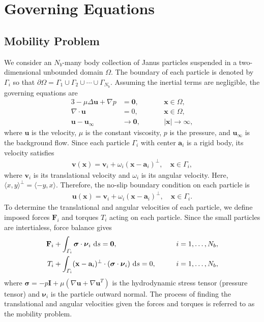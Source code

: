 \documentclass[lineno]{jfm}
\renewcommand{\aa}{\mathbf{a}}
\newcommand{\bd}{\partial}
\newcommand{\FF}{\mathbf{F}}
\newcommand{\nnu}{\boldsymbol{\nu}}
\newcommand{\ssigma}{\boldsymbol{\sigma}}
\newcommand{\xx}{\mathbf{x}}
\newcommand{\uu}{\mathbf{u}}
\renewcommand{\vv}{\mathbf{v}}
\begin{document}
\section{Governing Equations\label{sec:governing_eqs}}
\subsection{\label{mobility}Mobility Problem}
We consider an $N_b$-many body collection of Janus particles suspended
in a two-dimensional unbounded domain $\Omega$. The boundary of each
particle is denoted by $\Gamma_i$ so that $\bd \Omega = \Gamma_1 \cup
\Gamma_2 \cup \cdots \cup \Gamma_{N_b}$. Assuming the inertial terms are negligible, the
governing equations are
\begin{alignat}{3}
  -\mu \Delta \uu + \nabla p &= \mathbf{0}, 
    && \xx \in \Omega, \\
  \nabla\cdot \uu &= 0, \qquad && \xx \in \Omega, \\
  \uu - \uu_\infty &\to \mathbf{0}, && |\xx| \to \infty,
\end{alignat}
%
where $\uu$ is the velocity, $\mu$ is the constant viscosity, $p$ is the
pressure, and $\uu_\infty$ is the background flow. Since each particle
$\Gamma_i$ with center $\aa_i$ is a rigid body, its velocity satisfies 
\begin{align}
  \vv(\xx) = \vv_i + \omega_i (\xx - \aa_i)^\perp, \quad 
    \xx \in \Gamma_i,
\end{align}
where $\vv_i$ is its translational velocity and $\omega_i$ is its
angular velocity. Here, $\langle x, y \rangle^{\perp} = \langle -y, x
\rangle$. Therefore, the no-slip boundary condition on each particle is
\begin{align}
  \uu(\xx) = \vv_i + \omega_i (\xx - \aa_i)^\perp, \quad
    \xx \in \Gamma_i.
\end{align}
To determine the translational and angular velocities of each particle,
we define imposed forces $\FF_i$ and torques $T_i$ acting on each
particle. Since the small particles are intertialess, force balance
gives 
\begin{alignat}{2}
  \label{eq:force}
  \FF_i &+ \int_{\Gamma_i} \ssigma \cdot \nnu_i \, \dif s = \mathbf{0},
  && i=1,\ldots,N_b,\\
  \label{eq:torque}
  T_i &+ \int_{\Gamma_i} (\xx - \aa_i)^\perp \cdot 
    (\ssigma \cdot \nnu_i) \, \dif s = 0, \qquad && i=1,\ldots,N_b,
\end{alignat}
where $\ssigma = -p \mathbf{I} + \mu \left(\nabla \uu + \nabla \uu^T
\right)$ is the hydrodynamic stress tensor (pressure tensor) and
$\nnu_i$ is the particle outward normal. The process of finding the
translational and angular velocities given the forces and torques is
referred to as the mobility problem.
\end{document}
